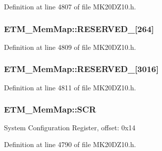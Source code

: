 Definition at line 4807 of file M\+K20\+D\+Z10.\+h.

\subsubsection[{\texorpdfstring{R\+E\+S\+E\+R\+V\+E\+D\+\_\+8}{RESERVED_8}}]{ E\+T\+M\+\_\+\+Mem\+Map\+::\+R\+E\+S\+E\+R\+V\+E\+D\+\_\mbox{[}264\mbox{]}}\hypertarget{struct_e_t_m___mem_map_a62a0e57c2eff8ef60130b8bbe396eaaf}{}\label{struct_e_t_m___mem_map_a62a0e57c2eff8ef60130b8bbe396eaaf}


Definition at line 4809 of file M\+K20\+D\+Z10.\+h.

\subsubsection[{\texorpdfstring{R\+E\+S\+E\+R\+V\+E\+D\+\_\+9}{RESERVED_9}}]{ E\+T\+M\+\_\+\+Mem\+Map\+::\+R\+E\+S\+E\+R\+V\+E\+D\+\_\mbox{[}3016\mbox{]}}\hypertarget{struct_e_t_m___mem_map_a1411976de513b89cd2b9e2bb45ecebd2}{}\label{struct_e_t_m___mem_map_a1411976de513b89cd2b9e2bb45ecebd2}


Definition at line 4811 of file M\+K20\+D\+Z10.\+h.

\subsubsection[{\texorpdfstring{S\+CR}{SCR}}]{ E\+T\+M\+\_\+\+Mem\+Map\+::\+S\+CR}\hypertarget{struct_e_t_m___mem_map_a21304c0be7e04790f0c022f40d2ef1aa}{}\label{struct_e_t_m___mem_map_a21304c0be7e04790f0c022f40d2ef1aa}
System Configuration Register, offset\+: 0x14 

Definition at line 4790 of file M\+K20\+D\+Z10.\+h.


